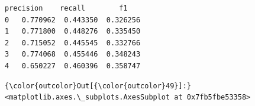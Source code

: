 \documentclass[11pt]{article}
\begin{document}
    \begin{Verbatim}[commandchars=\\\{\}]
   precision    recall        f1
0   0.770962  0.443350  0.326256
1   0.771800  0.448276  0.335450
2   0.715052  0.445545  0.332766
3   0.774068  0.455446  0.348243
4   0.650227  0.460396  0.358747

    \end{Verbatim}

\begin{Verbatim}[commandchars=\\\{\}]
{\color{outcolor}Out[{\color{outcolor}49}]:} <matplotlib.axes.\_subplots.AxesSubplot at 0x7fb5fbe53358>
\end{Verbatim}
            
    \begin{center}
    \end{center}
    { \hspace*{\fill} \\}
    
\end{document}
